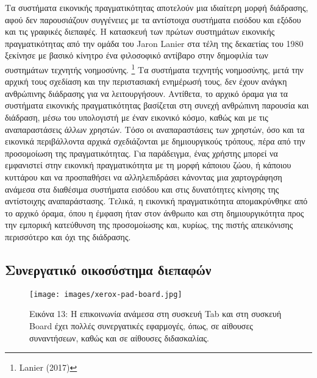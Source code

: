 \documentclass[
]{article}
\begin{document}
Τα συστήματα εικονικής πραγματικότητας αποτελούν μια ιδιαίτερη μορφή
διάδρασης, αφού δεν παρουσιάζουν συγγένειες με τα αντίστοιχα συστήματα
εισόδου και εξόδου και τις γραφικές διεπαφές. Η κατασκευή των πρώτων
συστημάτων εικονικής πραγματικότητας από την ομάδα του Jaron Lanier στα
τέλη της δεκαετίας του 1980 ξεκίνησε με βασικό κίνητρο ένα φιλοσοφικό
αντίβαρο στην δημοφιλία των συστημάτων τεχνητής νοημοσύνης. \footnote{Lanier
  (2017)} Τα συστήματα τεχνητής νοημοσύνης, μετά την αρχική τους
σχεδίαση και την περιστασιακή ενημέρωσή τους, δεν έχουν ανάγκη
ανθρώπινης διάδρασης για να λειτουργήσουν. Αντίθετα, το αρχικό όραμα για
τα συστήματα εικονικής πραγματικότητας βασίζεται στη συνεχή ανθρώπινη
παρουσία και διάδραση, μέσω του υπολογιστή με έναν εικονικό κόσμο, καθώς
και με τις αναπαραστάσεις άλλων χρηστών. Τόσο οι αναπαραστάσεις των
χρηστών, όσο και τα εικονικά περιβάλλοντα αρχικά σχεδιάζονται με
δημιουργικούς τρόπους, πέρα από την προσομοίωση της πραγματικότητας. Για
παράδειγμα, ένας χρήστης μπορεί να εμφανιστεί στην εικονική
πραγματικότητα με τη μορφή κάποιου ζώου, ή κάποιου κυττάρου και να
προσπαθήσει να αλληλεπιδράσει κάνοντας μια χαρτογράφηση ανάμεσα στα
διαθέσιμα συστήματα εισόδου και στις δυνατότητες κίνησης της αντίστοιχης
αναπαράστασης. Τελικά, η εικονική πραγματικότητα απομακρύνθηκε από το
αρχικό όραμα, όπου η έμφαση ήταν στον άνθρωπο και στη δημιουργικότητα
προς την εμπορική κατεύθυνση της προσομοίωσης και, κυρίως, της πιστής
απεικόνισης περισσότερο και όχι της διάδρασης.

\hypertarget{ux3c3ux3c5ux3bdux3b5ux3c1ux3b3ux3b1ux3c4ux3b9ux3baux3cc-ux3bfux3b9ux3baux3bfux3c3ux3cdux3c3ux3c4ux3b7ux3bcux3b1-ux3b4ux3b9ux3b5ux3c0ux3b1ux3c6ux3ceux3bd}{%
\subsection{Συνεργατικό οικοσύστημα
διεπαφών}\label{ux3c3ux3c5ux3bdux3b5ux3c1ux3b3ux3b1ux3c4ux3b9ux3baux3cc-ux3bfux3b9ux3baux3bfux3c3ux3cdux3c3ux3c4ux3b7ux3bcux3b1-ux3b4ux3b9ux3b5ux3c0ux3b1ux3c6ux3ceux3bd}}

\leavevmode{}%
\begin{figure}
\hypertarget{fig:xerox-pad-board}{%
\centering
\texttt{[image: images/xerox-pad-board.jpg]}
\caption{Εικόνα 13: Η επικοινωνία ανάμεσα στη συσκευή Tab και στη
συσκευή Board έχει πολλές συνεργατικές εφαρμογές, όπως, σε αίθουσες
συναντήσεων, καθώς και σε αίθουσες
διδασκαλίας.}\label{fig:xerox-pad-board}
}
\end{figure}
\end{document}
